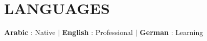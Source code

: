 \documentclass[letterpaper,11pt]{article}
\begin{document}
\section{LANGUAGES}
 \begin{itemize}[leftmargin=0in, label={}]
    \small{\item{
     \textbf{Arabic} {: Native} \hspace{1pt} $|$
     \hspace{1pt} \textbf{English} {: Professional} \hspace{1pt} $|$
     \hspace{1pt} \textbf{German} {: Learning}
    }}
 \end{itemize}

\end{document}
